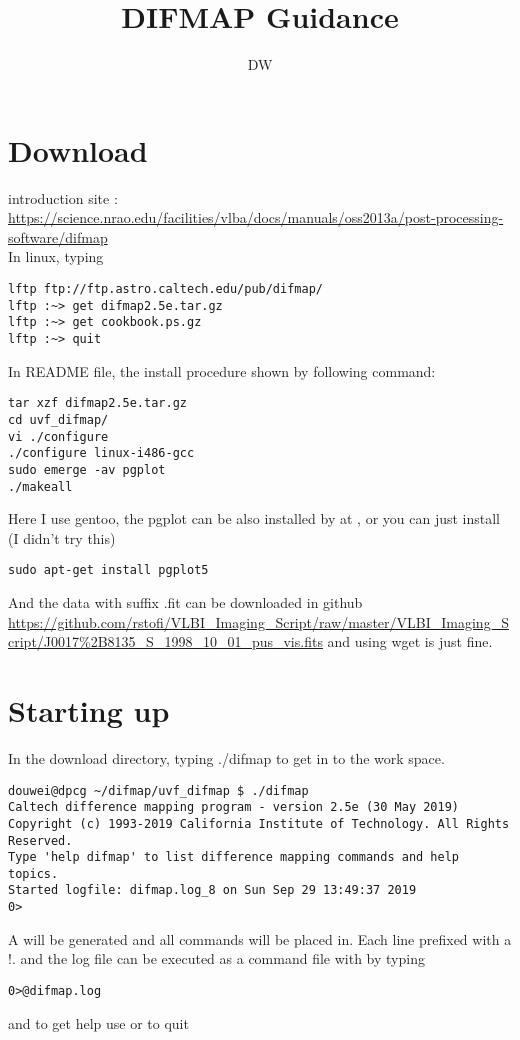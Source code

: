 \documentclass[a4paper,11pt]{article}
\title{DIFMAP Guidance}
\author{DW}
\begin{document}

\maketitle
\newpage
\tableofcontents
\newpage
\section{Download}

\par introduction site : \url{https://science.nrao.edu/facilities/vlba/docs/manuals/oss2013a/post-processing-software/difmap}\\
In linux, typing
\begin{lstlisting}[language={[ANSI]C}]
lftp ftp://ftp.astro.caltech.edu/pub/difmap/
lftp :~> get difmap2.5e.tar.gz 
lftp :~> get cookbook.ps.gz 
lftp :~> quit
\end{lstlisting}
In README file, the install procedure shown by following command:
\begin{lstlisting}[language={[ANSI]C}]
tar xzf difmap2.5e.tar.gz 
cd uvf_difmap/
vi ./configure
./configure linux-i486-gcc
sudo emerge -av pgplot
./makeall
\end{lstlisting}

Here I use gentoo, the pgplot can be also installed by  at , or you can just install (I didn't try this)
\begin{lstlisting}[language={[ANSI]C}]
sudo apt-get install pgplot5
\end{lstlisting}

And the data with suffix .fit can be downloaded in github \url{https://github.com/rstofi/VLBI_Imaging_Script/raw/master/VLBI_Imaging_Script/J0017%2B8135_S_1998_10_01_pus_vis.fits} and using wget is just fine.

\section{Starting up}
\par In the download directory, typing ./difmap to get in to the work space.
\tiny
\begin{lstlisting}[language={[ANSI]C}]
douwei@dpcg ~/difmap/uvf_difmap $ ./difmap
Caltech difference mapping program - version 2.5e (30 May 2019)
Copyright (c) 1993-2019 California Institute of Technology. All Rights Reserved.
Type 'help difmap' to list difference mapping commands and help topics.
Started logfile: difmap.log_8 on Sun Sep 29 13:49:37 2019
0>
\end{lstlisting}
\normalsize
\par A  will be generated and all commands will be placed in. Each line prefixed with a !. and the log file can be executed as a command file with  by typing
\begin{lstlisting}[language={[ANSI]C}]
0>@difmap.log
\end{lstlisting}
and  to get help use  or  to quit
\end{document}
